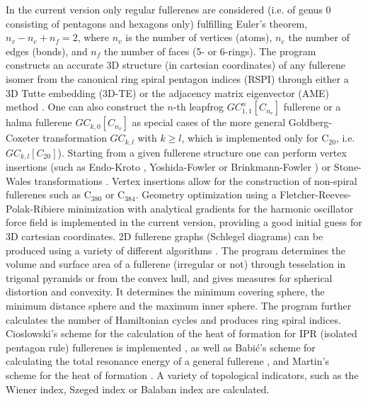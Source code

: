 \documentclass[article,a4paper,twoside]{memoir}
\newcommand{\C}[1]{\ensuremath{\mathrm{C}_{#1}}}
\begin{document}
In the current version only regular fullerenes are considered (i.e. of genus 0 consisting of pentagons and hexagons only) 
fulfilling Euler's theorem, $n_v - n_e + n_f = 2$, where $n_v$ is the number of vertices (atoms), $n_e$ the number of edges (bonds), and 
$n_f$ the number of faces (5- or 6-rings). The program constructs an accurate 3D structure (in cartesian coordinates) of any fullerene isomer 
from the canonical ring spiral pentagon indices (RSPI) through either a 3D Tutte embedding (3D-TE) \cite{Tutte} or the adjacency matrix
eigenvector (AME) method \cite{Atlas}. One can also construct the $n$-th leapfrog $GC_{1,1}^n[C_{n_v}]$ fullerene or a halma fullerene 
$GC_{k,0}[C_{n_v}]$ as special cases of the more general Goldberg-Coxeter transformation $GC_{k,l}$ with $k \geq l$, which is implemented
only for \C{20}, i.e. $GC_{k,l}[C_{20}]$). Starting from a given fullerene structure one can 
perform vertex insertions (such as Endo-Kroto \cite{Endo92}, Yoshida-Fowler \cite{Yoshida97a} or Brinkmann-Fowler \cite{BrinkmannFowler03})
or Stone-Wales transformations \cite{Stone86}. 
Vertex insertions allow for the construction of non-spiral fullerenes such as \C{380} or \C{384}. 
Geometry optimization using a Fletcher-Reeves-Polak-Ribiere
minimization \cite{NumRec} with analytical gradients for the harmonic oscillator force field \cite{Wu87} is implemented in the current version, providing 
a good initial guess for 3D cartesian coordinates. 2D fullerene graphs (Schlegel diagrams)
can be produced using a variety of different algorithms \cite{Plestenjak}. The program determines the volume and surface area 
of a fullerene (irregular or not) through tesselation in trigonal pyramids or from the convex hull, and gives measures for
spherical distortion and convexity. It determines the minimum covering sphere, the minimum distance sphere
and the maximum inner sphere. The program further calculates the number of Hamiltonian cycles
and produces ring spiral indices. Cioslowski's scheme for the calculation of the heat of formation for IPR
(isolated pentagon rule) fullerenes is implemented \cite{Cioslowski2000}, as well as Babi{\'c}'s scheme for calculating the 
total resonance energy of a general fullerene \cite{Babic1995,Babic1997}, and Martin's scheme for the heat of formation \cite{Alcami}.
A variety of topological indicators, such as the Wiener index, Szeged index or Balaban index are calculated.\cite{Wiener1947,Balaban}
\end{document}
